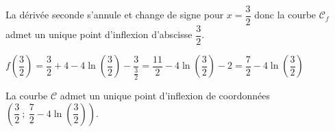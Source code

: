 \begin{enumerate}
La dérivée seconde s'annule et change de signe pour $x=\dfrac{3}{2}$ donc la courbe $\mathcal{C}_f$ admet un unique point d'inflexion d'abscisse $\dfrac{3}{2}$.

$f\left (\dfrac{3}{2}\right) = \dfrac{3}{2} +4 -4\ln\left (\dfrac{3}{2}\right ) -\dfrac{3}{\frac{3}{2}}
= \dfrac{11}{2} -4\ln\left (\dfrac{3}{2}\right ) -2
= \dfrac{7}{2} -4\ln\left (\dfrac{3}{2}\right ) $

La courbe $\mathcal{C}$ admet un unique point d'inflexion de coordonnées
$\left ( \dfrac{3}{2}~;~\dfrac{7}{2} -4\ln\left (\dfrac{3}{2}\right )\right )$.
 
\end{enumerate}
